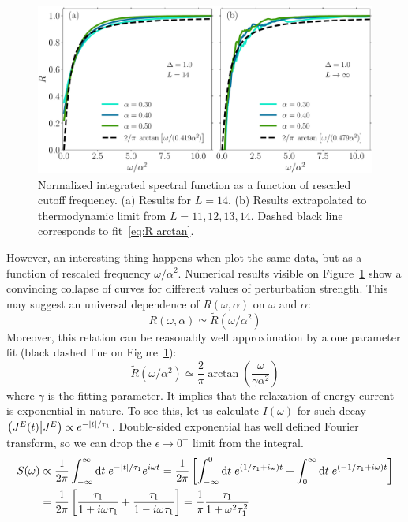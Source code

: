 \begin{figure}[htbp]
  \centering
  \includegraphics[width=\textwidth]{Figures/current_scaling.pdf}
  \caption{Normalized integrated spectral function as a function of rescaled cutoff frequency.
  (a) Results for \(L=14\). (b) Results extrapolated to thermodynamic limit from \(L=11,12,13,14\).
  Dashed black line corresponds to fit~\eqref{eq:R arctan}.}
  \label{fig:current decay scaling}
\end{figure}
However, an interesting thing happens when plot the same data, but as a function of rescaled
frequency \(\omega/\alpha^2\). Numerical results visible on Figure~\ref{fig:current decay scaling}
show a convincing collapse of curves for different values of perturbation strength. This may suggest
an universal dependence of \(R(\omega,\alpha)\) on \(\omega\) and \(\alpha\):
\begin{equation}
  R(\omega,\alpha)\simeq \tilde{R}(\omega/\alpha^2)
\end{equation}
Moreover, this relation can be reasonably well approximation by a one parameter fit
(black dashed line on Figure~\ref{fig:current decay scaling}):
\begin{equation}
  \tilde{R}(\omega/\alpha^2) \simeq \frac{2}{\pi} \arctan\left(\frac{\omega}{\gamma \alpha^2}\right)
\label{eq:R arctan}
\end{equation}
where \(\gamma \) is the fitting parameter. It implies that the relaxation of energy current
is exponential in nature. To see this, let us calculate \(I(\omega)\) for such decay
\(\left(J^E(t) \middle| J^E\right) \propto e^{-\abs{t}/\tau_1}\). Double-sided exponential has well defined Fourier
transform, so we can drop the \(\epsilon \to 0^{+}\) limit from the integral.
\begin{align}
  S(\omega) &\propto \frac{1}{2\pi} \int_{-\infty}^{\infty} \mathrm{d} t\; e^{-\abs{t}/\tau_1} e^{i \omega t} = 
  \frac{1}{2\pi} \left[\int_{-\infty}^{0} \mathrm{d} t\; e^{(1/\tau_1 + i\omega)t }
  + \int_{0}^{\infty} \mathrm{d} t\; e^{(-1/\tau_1 + i\omega)t }  \right] \nonumber \\
  &= \frac{1}{2\pi} \left[\frac{\tau_1}{1+i\omega \tau_1} + \frac{\tau_1}{1-i\omega\tau_1}\right] = 
  \frac{1}{\pi} \frac{\tau_1}{1+\omega^2\tau_1^2}
\end{align}
